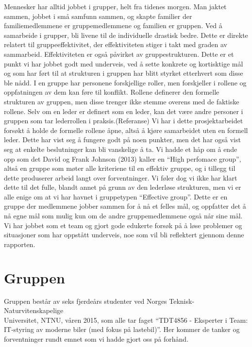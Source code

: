 Mennesker har alltid jobbet i grupper, helt fra tidenes morgen. Man jaktet sammen, jobbet i små samfunn sammen, og skapte familier der familiemedlemmene er gruppemedlemmene og familien er gruppen. Ved å samarbeide i grupper, bli livene til de individuelle drastisk bedre. Dette er direkte relatert til gruppeeffektivitet, der effektiviteten stiger i takt med graden av sammarbeid. Effektiviteten er også påvirket av gruppestrukturen. Dette er et punkt vi har jobbet godt med underveis, ved å sette konkrete og kortisktige mål og som har ført til at strukturen i gruppen har blitt styrket etterhvert som disse ble nådd. I en gruppe har personene forskjellige roller, men forskjeller i rollene og oppfatningen av dem kan føre til konflikt. Rollene definerer den formelle strukturen av gruppen, men disse trenger ikke stemme overens med de faktiske rollene. Selv om en leder er definert som en leder, kan det være andre personer i gruppen som tar lederrollen i praksis.(Referanse) Vi har i dette prosjektarbeidet forsøkt å holde de formelle rollene åpne, altså å kjøre samarbeidet uten en formell leder. Dette har vist seg å fungere godt på noen punkter, men det har også vist seg at enkelte beslutninger kan bli vanskelige å ta. Vi hadde et håp om å ende opp som det David og Frank Johnson (2013) kaller en “High perfomace group”, altså en gruppe som møter alle kriteriene til en effektiv gruppe, og i tillegg til dette produserer arbeid langt over forventninger. Vi føler dog vi ikke har klart dette til det fulle, blandt annet på grunn av den lederløse strukturen, men vi er alle enige om at vi har havnet i gruppetypen “Effective group”. Dette er en gruppe der medlemmene jobber sammen for å nå et felles mål, og oppfatter det å nå egne mål som mulig kun om de andre gruppemedlemmene også når sine mål. \cite{Artikkel2} Vi har jobbet som et team og gjort gode edukerte forsøk på å løse problemer og situasjoner som har oppstått underveis, noe som vil bli reflektert gjennom denne rapporten.


\chapter{Gruppen} 
Gruppen består av seks fjerdeårs studenter ved Norges Teknisk-
Naturvitenskapelige\\Universitet, NTNU, våren 2015, som alle tar faget ``TDT4856 
- Eksperter i Team: IT-styring av moderne biler (med fokus på lastebil)''.	 Her kommer de tanker og forventninger
rundt emnet som vi hadde gjort oss på forhånd.


